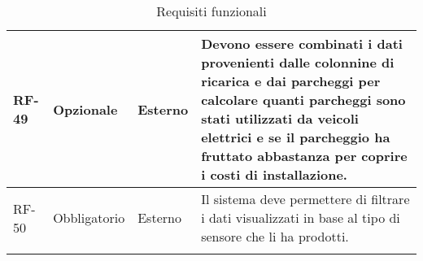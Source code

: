 \begin{longtable}{|>{\centering\arraybackslash}m{}|>{\centering\arraybackslash}m{}|>{\centering\arraybackslash}m{}|>{\centering\arraybackslash}m{}|}
	\\\hline
	RF-49           & Opzionale           & Esterno                                                                                                           & Devono essere combinati i dati provenienti dalle colonnine di ricarica e dai parcheggi per calcolare quanti parcheggi sono stati utilizzati da veicoli elettrici e se il parcheggio ha fruttato abbastanza per coprire i costi di installazione.
	\\\hline
	RF-50           & Obbligatorio        & Esterno                                                                                                           & Il sistema deve permettere di filtrare i dati visualizzati in base al tipo di sensore che li ha prodotti.
	\\\hline
	\caption{Requisiti funzionali}
\end{longtable}

\newpage


